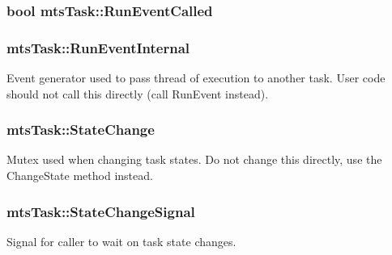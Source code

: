 \subsubsection[{Run\+Event\+Called}]{\setlength{\rightskip}{0pt plus 5cm}bool mts\+Task\+::\+Run\+Event\+Called\hspace{0.3cm}{\ttfamily [protected]}}\label{classmts_task_a274a28efd0acb799f30a25ca6a729956}
\hypertarget{classmts_task_a8c40d935488c3bdba29f88bef9ee7809}{}
\subsubsection[{Run\+Event\+Internal}]{ mts\+Task\+::\+Run\+Event\+Internal\hspace{0.3cm}{\ttfamily [protected]}}\label{classmts_task_a8c40d935488c3bdba29f88bef9ee7809}
Event generator used to pass thread of execution to another task. User code should not call this directly (call Run\+Event instead). \hypertarget{classmts_task_abcc895b6d73ea813783da11440e2fe3a}{}
\subsubsection[{State\+Change}]{ mts\+Task\+::\+State\+Change\hspace{0.3cm}{\ttfamily [protected]}}\label{classmts_task_abcc895b6d73ea813783da11440e2fe3a}
Mutex used when changing task states. Do not change this directly, use the Change\+State method instead. \hypertarget{classmts_task_a49ee515de5a8a49d2c307ed429ce390f}{}
\subsubsection[{State\+Change\+Signal}]{ mts\+Task\+::\+State\+Change\+Signal\hspace{0.3cm}{\ttfamily [protected]}}\label{classmts_task_a49ee515de5a8a49d2c307ed429ce390f}
Signal for caller to wait on task state changes. \hypertarget{classmts_task_afef3935273a3dfe792b7d3beb6b3c4f1}{}
